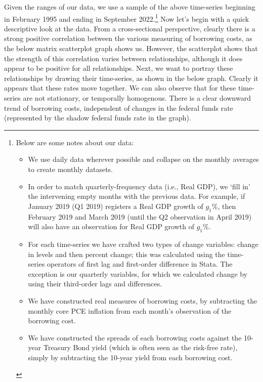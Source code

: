 \documentclass[12pt,final]{article}
\begin{document}
Given the ranges of our data, we use a sample of the above time-series beginning in February 1995 and ending in September 2022.\footnote{Below are some notes about our data: 
\begin{itemize}
	\itemsep-0.5em 
	\item We use daily data wherever possible and collapse on the monthly averages to create monthly datasets. 
	\item In order to match quarterly-frequency data (i.e., Real GDP), we `fill in' the intervening empty months with the previous data. For example, if January 2019 (Q1 2019) registers a Real GDP growth of $g_1$\%, then February 2019 and March 2019 (until the Q2 observation in April 2019) will also have an observation for Real GDP growth of $g_1$\%.
	\item For each time-series we have crafted two types of change variables: change in levels and then percent change; this was calculated using the time-series operators of first lag and first-order difference in Stata. The exception is our quarterly variables, for which we calculated change by using their third-order lags and differences.
	\item We have constructed real measures of borrowing costs, by subtracting the monthly core PCE inflation from each month's observation of the borrowing cost.
	\item We have constructed the spreads of each borrowing costs against the 10-year Treasury Bond yield (which is often seen as the risk-free rate), simply by subtracting the 10-year yield from each borrowing cost. 
\end{itemize} } Now let's begin with a quick descriptive look at the data. From a cross-sectional perspective, clearly there is a strong positive correlation between the various measuring of borrowing costs, as the below matrix scatterplot graph shows us. However, the scatterplot shows that the strength of this correlation varies between relationships, although it does appear to be positive for all relationships. Next, we want to portray these relationships by drawing their time-series, as shown in the below graph. Clearly it appears that these rates move together. We can also observe that for these time-series are not stationary, or temporally homogenous. There is a clear downward trend of borrowing costs, independent of changes in the federal funds rate (represented by the shadow federal funds rate in the graph). \\
\end{document}
